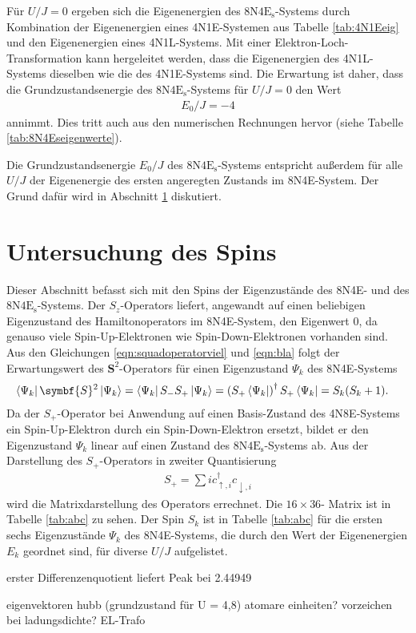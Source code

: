 Für $U/J = 0$ ergeben sich die Eigenenergien des $\text{8N4E}_\text{s}$-Systems durch Kombination der Eigenenergien eines 4N1E-Systemen aus Tabelle \ref{tab:4N1Eeig} und den Eigenenergien eines 4N1L-Systems.
Mit einer Elektron-Loch-Transformation kann hergeleitet werden, dass die Eigenenergien des 4N1L-Systems dieselben wie die des 4N1E-Systems sind.
Die Erwartung ist daher, dass die Grundzustandsenergie des $\text{8N4E}_\text{s}$-Systems für $U/J = 0$ den Wert
\begin{align}
  E_0/J = -4
\end{align}
annimmt. Dies tritt auch aus den numerischen Rechnungen hervor (siehe Tabelle \ref{tab:8N4Eseigenwerte}).

Die Grundzustandsenergie $E_0/J$ des $\text{8N4E}_\text{s}$-Systems entspricht außerdem für alle $U/J$ der Eigenenergie des ersten angeregten Zustands im 8N4E-System.
Der Grund dafür wird in Abschnitt \ref{sec:spin} diskutiert.

\section{Untersuchung des Spins}
\label{sec:spin}

Dieser Abschnitt befasst sich mit den Spins der Eigenzustände des 8N4E- und des $\text{8N4E}_\text{s}$-Systems.
Der $S_z$-Operators liefert, angewandt auf einen beliebigen Eigenzustand des Hamiltonoperators im 8N4E-System, den Eigenwert 0, da
genauso viele Spin-Up-Elektronen wie Spin-Down-Elektronen vorhanden sind. Aus den Gleichungen \eqref{eqn:squadoperatorviel} und \eqref{eqn:bla} folgt der Erwartungswert des $\symbf{S}^2$-Operators für einen Eigenzustand $\Psi_k$ des 8N4E-Systems
\begin{align}
  \bra{\Psi_k} \symbf{S}^2 \ket{\Psi_k} & = \bra{\Psi_k} S_- S_+ \ket{\Psi_k} = \left(S_+ \bra{\Psi_k}\right)^\dag S_+ \bra{\Psi_k} = S_k(S_k+1).
  \label{eqn:spin8N4E}
\end{align}
Da der $S_+$-Operator bei Anwendung auf einen Basis-Zustand des 4N8E-Systems ein Spin-Up-Elektron durch ein Spin-Down-Elektron ersetzt, bildet er den Eigenzustand $\Psi_k$ linear auf einen Zustand des $\text{8N4E}_\text{s}$-Systems ab.
Aus der Darstellung des $S_+$-Operators in zweiter Quantisierung
\begin{align}
  S_+ = \sum{i} c_{\uparrow,i}^\dag c_{\downarrow,i}^{\phantom{\dag}}
\end{align}
wird die Matrixdarstellung des Operators errechnet. Die $16 \times 36$- Matrix ist in Tabelle \ref{tab:abc} zu sehen.
Der Spin $S_k$ ist in Tabelle \ref{tab:abc} für die ersten sechs Eigenzustände $\Psi_k$ des 8N4E-Systems, die durch den Wert der Eigenenergien $E_k$ geordnet sind,
für diverse $U/J$ aufgelistet.



erster Differenzenquotient liefert Peak bei 2.44949

eigenvektoren hubb (grundzustand für U = 4,8)
atomare einheiten? vorzeichen bei ladungsdichte? EL-Trafo
